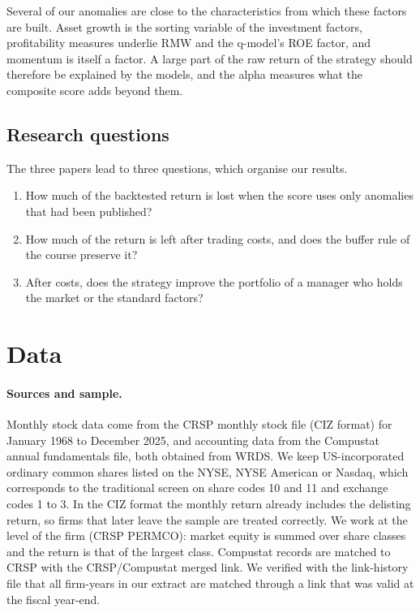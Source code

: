 \documentclass[12pt,a4paper]{article}
\begin{document}
Several of our anomalies are close to the characteristics from which these factors are built. Asset growth is the sorting variable of the investment factors, profitability measures underlie RMW and the q-model's ROE factor, and momentum is itself a factor. A large part of the raw return of the strategy should therefore be explained by the models, and the alpha measures what the composite score adds beyond them.

\subsection{Research questions}
The three papers lead to three questions, which organise our results.
\begin{enumerate}
\item How much of the backtested return is lost when the score uses only anomalies that had been published?
\item How much of the return is left after trading costs, and does the buffer rule of the course preserve it?
\item After costs, does the strategy improve the portfolio of a manager who holds the market or the standard factors?
\end{enumerate}

\section{Data}\label{sec:data}

\paragraph{Sources and sample.} Monthly stock data come from the CRSP monthly stock file (CIZ format) for January 1968 to December 2025, and accounting data from the Compustat annual fundamentals file, both obtained from WRDS. We keep US-incorporated ordinary common shares listed on the NYSE, NYSE American or Nasdaq, which corresponds to the traditional screen on share codes 10 and 11 and exchange codes 1 to 3. In the CIZ format the monthly return already includes the delisting return, so firms that later leave the sample are treated correctly. We work at the level of the firm (CRSP PERMCO): market equity is summed over share classes and the return is that of the largest class. Compustat records are matched to CRSP with the CRSP/Compustat merged link. We verified with the link-history file that all \linkrows{} firm-years in our extract are matched through a link that was valid at the fiscal year-end.
\end{document}
